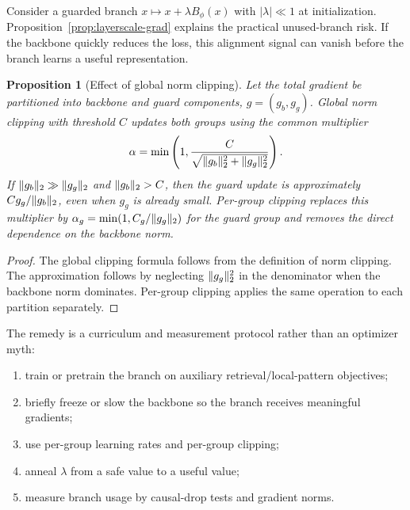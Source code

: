 \documentclass[11pt]{article}
\newtheorem{proposition}[theorem]{Proposition}
\DeclarePairedDelimiter{\norm}{\lVert}{\rVert}
\begin{document}
Consider a guarded branch $x\mapsto x+\lambda B_\phi(x)$ with $|\lambda|\ll1$ at initialization. Proposition~\ref{prop:layerscale-grad} explains the practical unused-branch risk. If the backbone quickly reduces the loss, this alignment signal can vanish before the branch learns a useful representation.

\begin{proposition}[Effect of global norm clipping]
\label{prop:global-clipping}
Let the total gradient be partitioned into backbone and guard components, $g=(g_b,g_g)$. Global norm clipping with threshold $C$ updates both groups using the common multiplier
\begin{equation}
\alpha = \min\left(1,\frac{C}{\sqrt{\norm{g_b}_2^2+\norm{g_g}_2^2}}\right).
\end{equation}
If $\norm{g_b}_2\gg \norm{g_g}_2$ and $\norm{g_b}_2>C$, then the guard update is approximately $C g_g/\norm{g_b}_2$, even when $g_g$ is already small. Per-group clipping replaces this multiplier by $\alpha_g=\min(1,C_g/\norm{g_g}_2)$ for the guard group and removes the direct dependence on the backbone norm.
\end{proposition}

\begin{proof}
The global clipping formula follows from the definition of norm clipping. The approximation follows by neglecting $\norm{g_g}_2^2$ in the denominator when the backbone norm dominates. Per-group clipping applies the same operation to each partition separately.
\end{proof}

The remedy is a curriculum and measurement protocol rather than an optimizer myth:
\begin{enumerate}
    \item train or pretrain the branch on auxiliary retrieval/local-pattern objectives;
    \item briefly freeze or slow the backbone so the branch receives meaningful gradients;
    \item use per-group learning rates and per-group clipping;
    \item anneal $\lambda$ from a safe value to a useful value;
    \item measure branch usage by causal-drop tests and gradient norms.
\end{enumerate}
\end{document}
